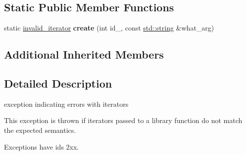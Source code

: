 \subsection*{Static Public Member Functions}
\begin{DoxyCompactItemize}
\item 
\mbox{\label{classnlohmann_1_1detail_1_1invalid__iterator_a4e849260a3caa1b288c7e619130c6c09}} 
static \hyperlink{classnlohmann_1_1detail_1_1invalid__iterator}{invalid\+\_\+iterator} {\bfseries create} (int id\+\_\+, const \hyperlink{namespacenlohmann_1_1detail_a1ed8fc6239da25abcaf681d30ace4985ab45cffe084dd3d20d928bee85e7b0f21}{std\+::string} \&what\+\_\+arg)
\end{DoxyCompactItemize}
\subsection*{Additional Inherited Members}


\subsection{Detailed Description}
exception indicating errors with iterators 

This exception is thrown if iterators passed to a library function do not match the expected semantics.

Exceptions have ids 2xx.

